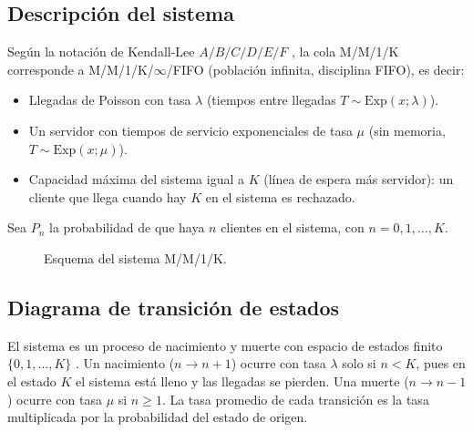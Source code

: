 \documentclass[12pt]{article}
\begin{document}
\subsection{Descripción del sistema}

Según la notación de Kendall-Lee $A/B/C/D/E/F$ \autocite[cap.~1]{shortle2018}, la cola M/M/1/K corresponde a M/M/1/K/$\infty$/FIFO (población infinita, disciplina FIFO), es decir:

\begin{itemize}
    \item Llegadas de Poisson con tasa $\lambda$ (tiempos entre llegadas $T\sim \mathrm{Exp}(x;\lambda)$).
    \item Un servidor con tiempos de servicio exponenciales de tasa $\mu$ (sin memoria, $T\sim \mathrm{Exp}(x;\mu)$).
    \item Capacidad máxima del sistema igual a $K$ (línea de espera más servidor): un cliente que llega cuando hay $K$ en el sistema es rechazado.
\end{itemize}

Sea $P_n$ la probabilidad de que haya $n$ clientes en el sistema, con $n=0,1,\dots,K$.

\begin{figure}[h]
\centering
{}
\caption{Esquema del sistema M/M/1/K.}
\end{figure}

\subsection{Diagrama de transición de estados}

El sistema es un proceso de nacimiento y muerte con espacio de estados finito $\{0,1,\dots,K\}$ \autocite[cap.~3]{shortle2018}. Un nacimiento ($n\to n+1$) ocurre con tasa $\lambda$ solo si $n<K$, pues en el estado $K$ el sistema está lleno y las llegadas se pierden. Una muerte ($n\to n-1$) ocurre con tasa $\mu$ si $n\geq 1$. La tasa promedio de cada transición es la tasa multiplicada por la probabilidad del estado de origen.
\end{document}
